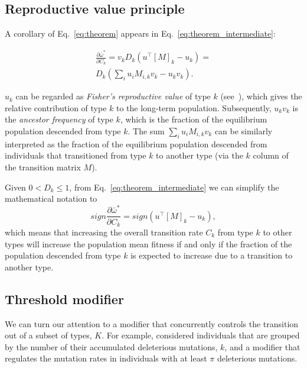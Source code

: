 \documentclass[a4paper,twocolumn]{article}   	%
\newcommand*{\tr}{^\intercal}
\begin{document}
\subsection*{Reproductive value principle}

A corollary of Eq.~\ref{eq:theorem} appears in Eq.~\ref{eq:theorem_intermediate}:

\begin{multline}\label{eq:corollary_reproductive_value}
\frac{\partial \bar{\omega}^*}{\partial C_k} = 
v_k D_k (u\tr[M]_k - u_k) = \\
D_k (\sum_i{u_i M_{i,k} v_k} - u_k v_k).
\end{multline}

$u_k$ can be regarded as \emph{Fisher's reproductive value} of type $k$ (see~), which gives the relative contribution of type $k$ to the long-term population.
Subsequently, $u_k v_k$ is the \emph{ancestor frequency} \citep{Hermisson2002} of type $k$, which is the fraction of the equilibrium population descended from type $k$.
The sum $\sum_i{u_i M_{i,k} v_k}$ can be similarly interpreted as the fraction of the equilibrium population descended from individuals that transitioned from type $k$ to another type (via the $k$ column of the transition matrix $M$).

Given $0 < D_k \le 1$, from Eq.~\ref{eq:theorem_intermediate} we can simplify the mathematical notation to 
$$
sign \frac{\partial \bar{\omega}^*}{\partial C_k} = 
sign (u\tr [M]_k - u_k),
$$
which means that increasing the overall transition rate $C_k$ from type $k$ to other types will increase the population mean fitness if and only if the fraction of the population descended from type $k$ is expected to increase due to a transition to another type.

\subsection*{Threshold modifier}

We can turn our attention to a modifier that concurrently controls the transition out of a subset of types, $K$.
For example, \citet[Appendix~B]{Ram2012} considered individuals that are grouped by the number of their accumulated deleterious mutations, $k$, and a modifier that regulates the mutation rates in individuals with at least $\pi$ deleterious mutations.
\end{document}
